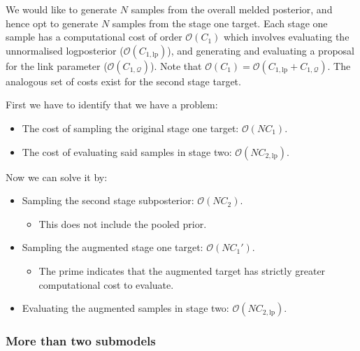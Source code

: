 \documentclass[10pt,a4paper,]{article}
\providecommand{\tightlist}{%
  \setlength{\itemsep}{0pt}\setlength{\parskip}{0pt}}
\newcommand{\Nx}{N}
\begin{document}
We would like to generate \(\Nx\) samples from the overall melded
posterior, and hence opt to generate \(\Nx\) samples from the stage one
target. Each stage one sample has a computational cost of order
\(\mathcal{O}(C_{1})\) which involves evaluating the unnormalised
logposterior (\(\mathcal{O}(C_{1, \text{lp}})\)), and generating and
evaluating a proposal for the link parameter
(\(\mathcal{O}(C_{1, \mathcal{Q}})\)). Note that
\(\mathcal{O}(C_{1}) = \mathcal{O}(C_{1, \text{lp}} + C_{1, \mathcal{Q}})\).
The analogous set of costs exist for the second stage target.

First we have to identify that we have a problem:

\begin{itemize}
\tightlist
\item
  The cost of sampling the original stage one target:
  \(\mathcal{O}(\Nx C_{1})\).
\item
  The cost of evaluating said samples in stage two:
  \(\mathcal{O}(\Nx C_{2, \text{lp}})\).
\end{itemize}

Now we can solve it by:

\begin{itemize}
\tightlist
\item
  Sampling the second stage subposterior: \(\mathcal{O}(\Nx C_{2})\).

  \begin{itemize}
  \tightlist
  \item
    This does not include the pooled prior.
  \end{itemize}
\item
  Sampling the augmented stage one target: \(\mathcal{O}(\Nx C_{1}')\).

  \begin{itemize}
  \tightlist
  \item
    The prime indicates that the augmented target has strictly greater
    computational cost to evaluate.
  \end{itemize}
\item
  Evaluating the augmented samples in stage two:
  \(\mathcal{O}(\Nx C_{2, \text{lp}})\).
\end{itemize}

\subsubsection*{More than two submodels}\label{more-than-two-submodels}
\end{document}
